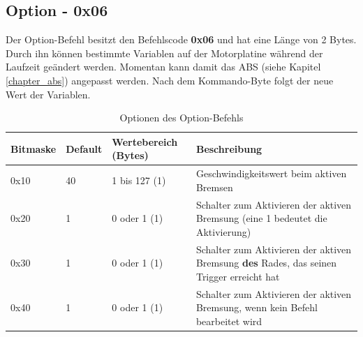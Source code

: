 \subsection{Option - 0x06}
Der Option-Befehl besitzt den Befehlscode \textbf{0x06} und hat eine Länge von 2 Bytes.
Durch ihn können bestimmte Variablen auf der Motorplatine während der Laufzeit
geändert werden. Momentan kann damit das ABS (siehe Kapitel \ref{chapter_abs}) angepasst werden. Nach dem
Kommando-Byte folgt der neue Wert der Variablen.
\begin{table}[htb]
\begin{center}
	\begin{tabularx}{\linewidth}{|l|l|l|X|}
		\hline
		\textbf{Bitmaske} & \textbf{Default} & \textbf{Wertebereich (Bytes)} & \textbf{Beschreibung} \\
		\hline
		\hline
		0x10 & 40 & 1 bis 127 (1) & Geschwindigkeitswert beim aktiven Bremsen\\
		\hline
		0x20 & 1 & 0 oder 1 (1) & Schalter zum Aktivieren der aktiven Bremsung (eine 1 bedeutet die Aktivierung)\\
		\hline
		0x30 & 1 & 0 oder 1 (1) & Schalter zum Aktivieren der aktiven Bremsung \textbf{des} Rades, das seinen Trigger erreicht hat\\
		\hline
		0x40 & 1 & 0 oder 1 (1) & Schalter zum Aktivieren der aktiven Bremsung, wenn kein Befehl bearbeitet wird\\
		\hline
	\end{tabularx}
	\caption{\label{protocol_option} Optionen des Option-Befehls}
\end{center}
\end{table}
